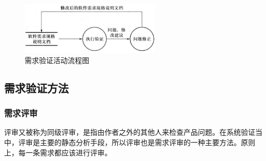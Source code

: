 \begin{figure}[H]
    \centering
    \vspace{-0.2em}
	\includegraphics[width=0.6\textwidth]{img/需求验证活动流程图.png}
    \caption*{需求验证活动流程图}
    \vspace{-1em}
\end{figure}


\subsection{需求验证方法}

\subsubsection{需求评审}
评审又被称为同级评审，是指由作者之外的其他人来检查产品问题。在系统验证当中，评审是主要的静态分析手段，所以评审也是需求评审的一种主要方法。原则上，每一条需求都应该进行评审。

